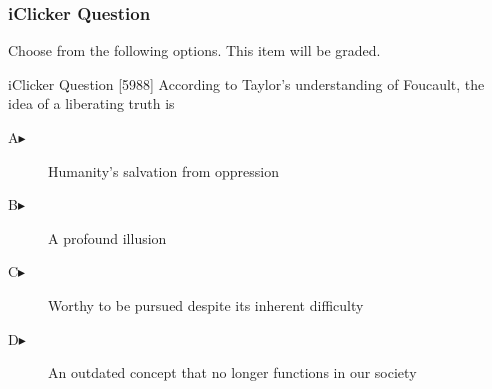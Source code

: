\begin{frame}
  \frametitle{iClicker Question}
Choose from the following options. This item will be graded.
\begin{block}{iClicker Question}
[5988]   According to Taylor's understanding of Foucault, the idea of a
  liberating truth is 
\end{block}
\begin{description}
\item[A\hspace{.2in}$\blacktriangleright$] Humanity's salvation from oppression
\item[B\hspace{.2in}$\blacktriangleright$] A profound illusion
\item[C\hspace{.2in}$\blacktriangleright$] Worthy to be pursued despite its inherent difficulty
\item[D\hspace{.2in}$\blacktriangleright$] An outdated concept that no longer functions in our society
\end{description}
\end{frame}
